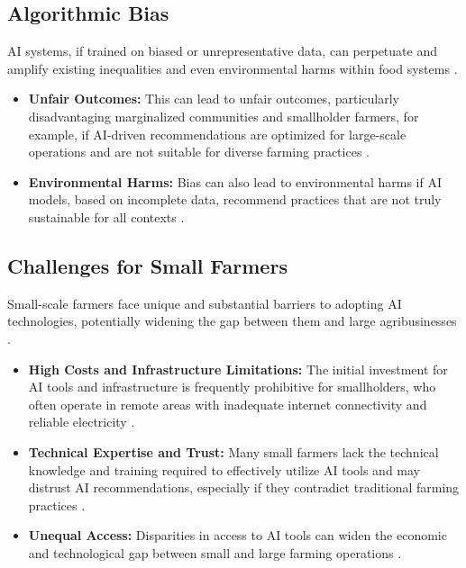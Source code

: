\subsection{Algorithmic Bias}
AI systems, if trained on biased or unrepresentative data, can perpetuate and amplify existing inequalities and even environmental harms within food systems \cite{SustainabilityDirectory_AlgorithmicBias_1}.
\begin{itemize}
    \item \textbf{Unfair Outcomes:} This can lead to unfair outcomes, particularly disadvantaging marginalized communities and smallholder farmers, for example, if AI-driven recommendations are optimized for large-scale operations and are not suitable for diverse farming practices \cite{SustainabilityDirectory_AlgorithmicBias_2}.
    \item \textbf{Environmental Harms:} Bias can also lead to environmental harms if AI models, based on incomplete data, recommend practices that are not truly sustainable for all contexts \cite{SustainabilityDirectory_AlgorithmicBias_3}.
\end{itemize}

\subsection{Challenges for Small Farmers}
Small-scale farmers face unique and substantial barriers to adopting AI technologies, potentially widening the gap between them and large agribusinesses \cite{JumpstartMag_SmallFarmers}.
\begin{itemize}
    \item \textbf{High Costs and Infrastructure Limitations:} The initial investment for AI tools and infrastructure is frequently prohibitive for smallholders, who often operate in remote areas with inadequate internet connectivity and reliable electricity \cite{HeyCoach_DataPrivacy, ResearchGate_SmallFarmers}.
    \item \textbf{Technical Expertise and Trust:} Many small farmers lack the technical knowledge and training required to effectively utilize AI tools and may distrust AI recommendations, especially if they contradict traditional farming practices \cite{HeyCoach_DataPrivacy, ArgonAndCo_SmallFarmers}.
\item \textbf{Unequal Access:} Disparities in access to AI tools can widen the economic and technological gap between small and large farming operations \cite{Meegle_Ethical}.
\end{itemize}

